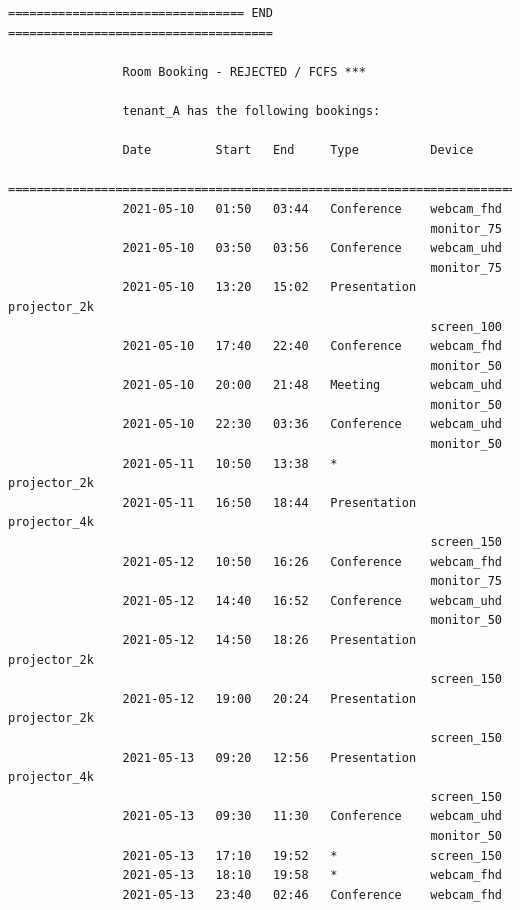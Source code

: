 \documentclass{article}
\begin{document}
\begin{Verbatim}[gobble=8]
                ================================= END =====================================
                
                Room Booking - REJECTED / FCFS ***
                
                tenant_A has the following bookings:
                
                Date         Start   End     Type          Device
                ===========================================================================
                2021-05-10   01:50   03:44   Conference    webcam_fhd
                                                           monitor_75
                2021-05-10   03:50   03:56   Conference    webcam_uhd
                                                           monitor_75
                2021-05-10   13:20   15:02   Presentation  projector_2k
                                                           screen_100
                2021-05-10   17:40   22:40   Conference    webcam_fhd
                                                           monitor_50
                2021-05-10   20:00   21:48   Meeting       webcam_uhd
                                                           monitor_50
                2021-05-10   22:30   03:36   Conference    webcam_uhd
                                                           monitor_50
                2021-05-11   10:50   13:38   *             projector_2k
                2021-05-11   16:50   18:44   Presentation  projector_4k
                                                           screen_150
                2021-05-12   10:50   16:26   Conference    webcam_fhd
                                                           monitor_75
                2021-05-12   14:40   16:52   Conference    webcam_uhd
                                                           monitor_50
                2021-05-12   14:50   18:26   Presentation  projector_2k
                                                           screen_150
                2021-05-12   19:00   20:24   Presentation  projector_2k
                                                           screen_150
                2021-05-13   09:20   12:56   Presentation  projector_4k
                                                           screen_150
                2021-05-13   09:30   11:30   Conference    webcam_uhd
                                                           monitor_50
                2021-05-13   17:10   19:52   *             screen_150
                2021-05-13   18:10   19:58   *             webcam_fhd
                2021-05-13   23:40   02:46   Conference    webcam_fhd

\end{Verbatim}
\end{document}
